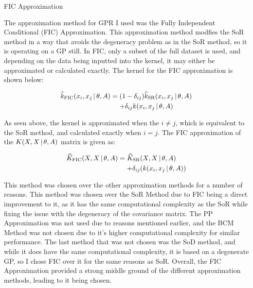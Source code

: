 \documentclass[final]{beamer}
\newcommand{\vbar}{\hspace{-0.4mm} \mathrel{|} \hspace{-0.4mm}}
\newlength{\onecolwid}
\newlength{\twocolwid}
\begin{document}
\begin{frame}[t]
\begin{columns}[t]
\begin{column}{\twocolwid}
\begin{columns}[t,totalwidth=\twocolwid]
\begin{column}{\onecolwid}

\begin{block}{FIC Approximation}

    The approximation method for GPR I used was the Fully Independent Conditional (FIC)
    Approximation. This approximation method modfies the SoR method
    in a way that avoids the degeneracy problem as in the SoR
    method, so it is operating on a GP still. In FIC, only a subset of the full dataset is used,
    and depending on the data being inputted into the kernel, it may either be approximated or
    calculated exactly. The kernel for the FIC approximation is shown below:\vspace{-1.25cm}

    \begin{align*}
        \widehat{k}_{\text{FIC}}(x_{i}, x_{j} \vbar \theta, A) &= (1 - \delta_{ij})\widehat{k}_{\text{SR}}(x_{i}, x_{j} \vbar \theta, A) \\
                                                               &\mathrel{\phantom{=}} + \delta_{ij} k(x_{i}, x_{j} \vbar \theta, A)
    \end{align*}

    As seen above, the kernel is approximated when the $i \neq j$, which is equivalent to the
    SoR method, and calculated exactly when $i = j$. The FIC
    approximation of the $K(X, X \vbar \theta, A)$ matrix is given as:\vspace{-1.25cm}

    \begin{align*}
        \widehat{K}_{\text{FIC}}(X, X  \vbar \theta, A) &= \widehat{K}_{\text{SR}}(X, X  \vbar \theta, A) \\
                                                        &\mathrel{\phantom{=}}+ \delta_{ij}(k(x_{i}, x_{j} \vbar \theta, A))
    \end{align*}

    This method was chosen over the other approximation methods for a number
    of reasons.
    This method was chosen over the SoR Method due to FIC being a direct
    improvement to it, as it has the same computational complexity as the SoR while fixing the
    issue with the degeneracy of the covariance matrix.
    The PP Approximation was not used due to reasons mentioned earlier, and the
    BCM Method was not chosen due to it's higher computational complexity
    for similar performance. The last method that was not chosen was the SoD method,
    and while it does have the same computational complexity, it is based on a degenerate GP, so I
    chose FIC over it for the same reasons as SoR. Overall, the FIC Approximation
    provided a strong middle ground of the different approximation methods, leading to it being
    chosen.


\end{block}
\end{column}
\end{columns}
\end{column}
\end{columns}
\end{frame}
\end{document}
